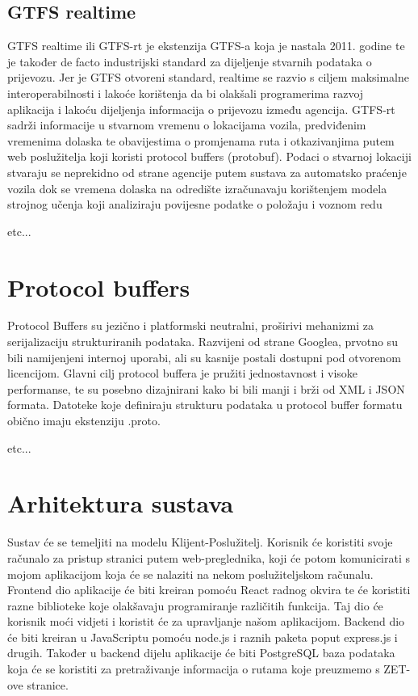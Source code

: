 \documentclass[zavrsnirad]{fer}
\begin{document}
\subsection{GTFS realtime}

GTFS realtime ili GTFS-rt je ekstenzija GTFS-a koja je nastala 2011. godine te je također de facto
industrijski standard za dijeljenje stvarnih podataka o prijevozu. Jer je GTFS otvoreni standard,
realtime se razvio s ciljem maksimalne interoperabilnosti i lakoće korištenja da bi olakšali
programerima razvoj aplikacija i lakoću dijeljenja informacija o prijevozu između agencija. GTFS-rt
sadrži informacije u stvarnom vremenu o lokacijama vozila, predviđenim vremenima dolaska te
obavijestima o promjenama ruta i otkazivanjima putem web poslužitelja koji koristi protocol buffers
(protobuf). Podaci o stvarnoj lokaciji stvaraju se neprekidno od strane agencije putem sustava za
automatsko praćenje vozila dok se vremena dolaska na odredište izračunavaju korištenjem modela
strojnog učenja koji analiziraju povijesne podatke o položaju i voznom redu

etc...

\section[Protobuf]{Protocol buffers}

Protocol Buffers su jezično i platformski neutralni, proširivi mehanizmi za serijalizaciju
strukturiranih podataka. Razvijeni od strane Googlea, prvotno su bili namijenjeni internoj uporabi,
ali su kasnije postali dostupni pod otvorenom licencijom. Glavni cilj protocol buffera je pružiti
jednostavnost i visoke performanse, te su posebno dizajnirani kako bi bili manji i brži od XML i
JSON formata. Datoteke koje definiraju strukturu podataka u protocol buffer formatu obično imaju
ekstenziju .proto.

etc...

\section{Arhitektura sustava}

Sustav će se temeljiti na modelu Klijent-Poslužitelj. Korisnik će koristiti svoje računalo za pristup
stranici putem web-preglednika, koji će potom komunicirati s mojom aplikacijom koja će se nalaziti
na nekom poslužiteljskom računalu. Frontend dio aplikacije će biti kreiran pomoću React radnog
okvira te će koristiti razne biblioteke koje olakšavaju programiranje različitih funkcija. Taj dio će
korisnik moći vidjeti i koristit će za upravljanje našom aplikacijom. Backend dio će biti kreiran u
JavaScriptu pomoću node.js i raznih paketa poput express.js i drugih. Također u backend dijelu
aplikacije će biti PostgreSQL baza podataka koja će se koristiti za pretraživanje informacija o
rutama koje preuzmemo s ZET-ove stranice.
\end{document}
